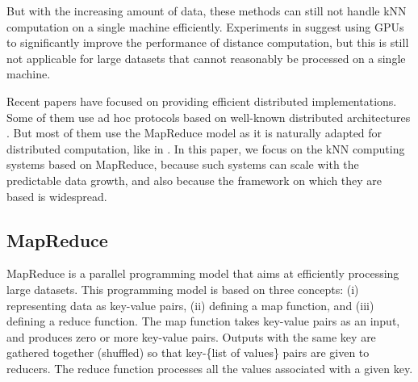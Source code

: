 But with the increasing amount of data, these methods can still not handle kNN computation 
on a single machine efficiently. Experiments in \cite{10.1371/journal.pone.0044000} suggest using GPUs to significantly improve the 
performance of distance computation, but this is still not applicable for large datasets that cannot reasonably be processed on a single machine. 

Recent papers have focused on providing efficient distributed implementations. Some of 
them use ad hoc protocols based on well-known distributed architectures \cite{Novak:2006:MSD:1146847.1146866,Haghani_lshat}. But most of them use the MapReduce model as it is naturally adapted for distributed computation, like in \cite{Stupar10rankreduce-,Lu:2012:EPK:2336664.2336674,Zhang:2012:EPK:2247596.2247602}. In this paper, we focus on the kNN computing systems based on MapReduce, because such systems can scale with the predictable data growth, and also because the framework on which they are based is widespread. 

%


\subsection{MapReduce}
MapReduce \cite{Dean:2008:MSD:1327452.1327492} is a parallel programming model that aims at efficiently processing large datasets. This programming 
model is based on three concepts: (i) representing data as key-value pairs, (ii) defining a map function, and (iii) defining a reduce function. 
The map function takes key-value pairs as an input, and produces zero or more key-value pairs. Outputs with the same key are gathered together (shuffled) so that key-\{list of values\} pairs are given to reducers. The reduce function processes all the values associated
with a given key. 

